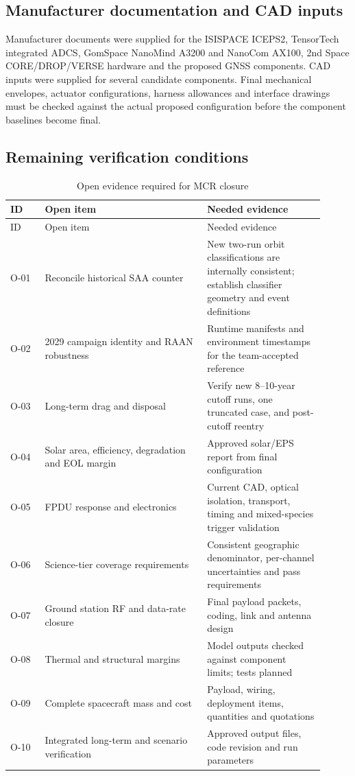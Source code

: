 \subsection{Manufacturer documentation and CAD inputs}
Manufacturer documents were supplied for the ISISPACE ICEPS2, TensorTech integrated ADCS, GomSpace NanoMind A3200 and NanoCom AX100, 2nd Space CORE/DROP/VERSE hardware and the proposed GNSS components. CAD inputs were supplied for several candidate components. Final mechanical envelopes, actuator configurations, harness allowances and interface drawings must be checked against the actual proposed configuration before the component baselines become final.

\subsection{Remaining verification conditions}\label{sec:new-evidence-open}
\begin{longtable}{p{0.10\linewidth}p{0.47\linewidth}p{0.34\linewidth}}\caption{Open evidence required for MCR closure}\label{tab:new-open}\\\toprule ID & Open item & Needed evidence \\
\midrule\endfirsthead\toprule ID & Open item & Needed evidence \\
\midrule\endhead
O-01 & Reconcile historical SAA counter & New two-run orbit classifications are internally consistent; establish classifier geometry and event definitions \\
O-02 & 2029 campaign identity and RAAN robustness & Runtime manifests and environment timestamps for the team-accepted reference \\
O-03 & Long-term drag and disposal & Verify new 8--10-year cutoff runs, one truncated case, and post-cutoff reentry \\
O-04 & Solar area, efficiency, degradation and EOL margin & Approved solar/EPS report from final configuration \\
O-05 & FPDU response and electronics & Current CAD, optical isolation, transport, timing and mixed-species trigger validation \\
O-06 & Science-tier coverage requirements & Consistent geographic denominator, per-channel uncertainties and pass requirements \\
O-07 & Ground station RF and data-rate closure & Final payload packets, coding, link and antenna design \\
O-08 & Thermal and structural margins & Model outputs checked against component limits; tests planned \\
O-09 & Complete spacecraft mass and cost & Payload, wiring, deployment items, quantities and quotations \\
O-10 & Integrated long-term and scenario verification & Approved output files, code revision and run parameters \\
\bottomrule\end{longtable}

